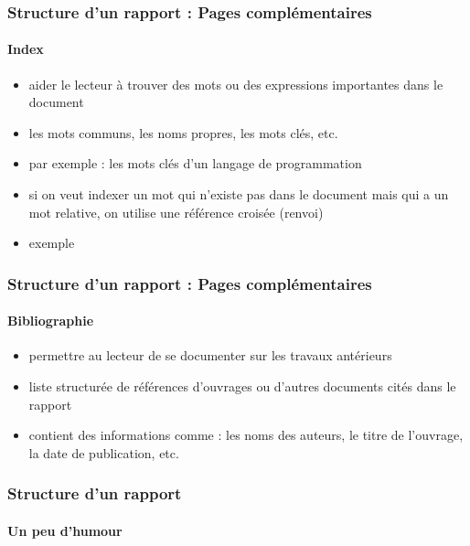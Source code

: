 \documentclass[xcolor=table]{beamer}
\begin{document}
\begin{frame}
\frametitle{Structure d'un rapport : Pages complémentaires}
\framesubtitle{Index}

\begin{minipage}{0.60\textwidth}
	\begin{itemize}
		\item aider le lecteur à trouver des mots ou des expressions importantes dans le document
		\item les mots communs, les noms propres, les mots clés, etc. 
		\item par exemple : les mots clés d'un langage de programmation 
		\item si on veut indexer un mot qui n'existe pas dans le document mais qui a un mot relative, on utilise une référence croisée (renvoi) 
		\item exemple 
	\end{itemize}
\end{minipage}
\begin{minipage}{0.38\textwidth}
\end{minipage}

\end{frame}


\begin{frame}
\frametitle{Structure d'un rapport : Pages complémentaires}
\framesubtitle{Bibliographie}

\begin{minipage}{0.60\textwidth}
	\begin{itemize}
		\item permettre au lecteur de se documenter sur les travaux antérieurs
		\item liste structurée de références d'ouvrages ou d'autres documents cités dans le rapport
		\item contient des informations comme : les noms des auteurs, le titre de l'ouvrage, la date de publication, etc.
	\end{itemize}
\end{minipage}
\begin{minipage}{0.38\textwidth}
\end{minipage}

\end{frame}

\begin{frame}
\frametitle{Structure d'un rapport}
\framesubtitle{Un peu d'humour}

\begin{center}
\end{center}

\end{frame}
\end{document}
